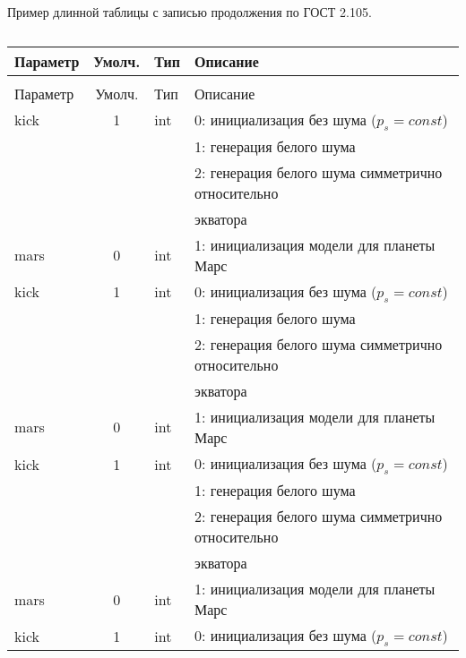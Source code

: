 \begin{refsection}
Пример длинной таблицы с записью продолжения по ГОСТ 2.105.
\begingroup
\centering
\smallA
\begin{longtable}[c]{|l|c|l|l|}
	\caption{Наименование таблицы средней длины}%
	\label{tbl:test5}%
	\\
	\hline
	Параметр & Умолч. & Тип & Описание\\ \hline
	\endfirsthead%
	\captionsetup{format=tablenocaption,labelformat=continued}%
	\caption[]{}\\
	\hline
	Параметр & Умолч. & Тип & Описание\\ \hline
	\endhead
	\hline
	\endfoot
	\hline
	\endlastfoot
	kick & 1 & int & 0: инициализация без шума ($p_s = const$) \\
	&   &     & 1: генерация белого шума                  \\
	&   &     & 2: генерация белого шума симметрично относительно \\
	& & & экватора    \\
	mars & 0 & int & 1: инициализация модели для планеты Марс     \\
	kick & 1 & int & 0: инициализация без шума ($p_s = const$) \\
	&   &     & 1: генерация белого шума                  \\
	&   &     & 2: генерация белого шума симметрично относительно \\
		& & & экватора    \\
	mars & 0 & int & 1: инициализация модели для планеты Марс     \\
	kick & 1 & int & 0: инициализация без шума ($p_s = const$) \\
	&   &     & 1: генерация белого шума                  \\
	&   &     & 2: генерация белого шума симметрично относительно \\
		& & & экватора    \\
	mars & 0 & int & 1: инициализация модели для планеты Марс     \\
	kick & 1 & int & 0: инициализация без шума ($p_s = const$) \\

\end{longtable}
\end{refsection}
